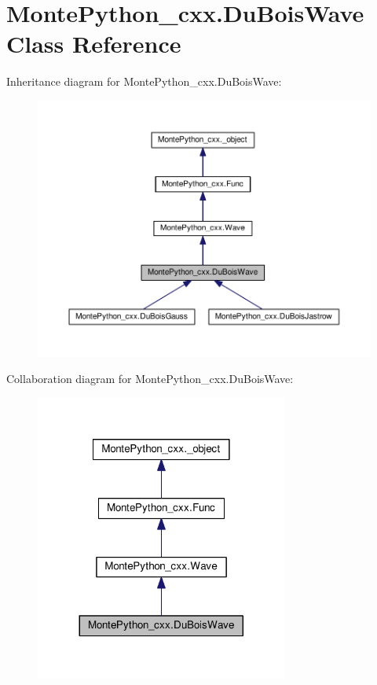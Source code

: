 \hypertarget{classMontePython__cxx_1_1DuBoisWave}{}\section{Monte\+Python\+\_\+cxx.\+Du\+Bois\+Wave Class Reference}
\label{classMontePython__cxx_1_1DuBoisWave}


Inheritance diagram for Monte\+Python\+\_\+cxx.\+Du\+Bois\+Wave\+:
\nopagebreak
\begin{figure}[H]
\begin{center}
\leavevmode
\includegraphics[width=350pt]{classMontePython__cxx_1_1DuBoisWave__inherit__graph}
\end{center}
\end{figure}


Collaboration diagram for Monte\+Python\+\_\+cxx.\+Du\+Bois\+Wave\+:
\nopagebreak
\begin{figure}[H]
\begin{center}
\leavevmode
\includegraphics[width=236pt]{classMontePython__cxx_1_1DuBoisWave__coll__graph}
\end{center}
\end{figure}
